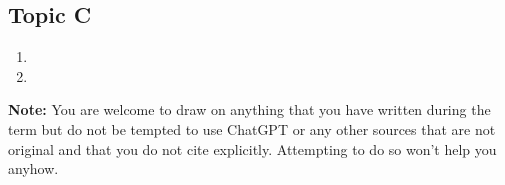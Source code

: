 \documentclass[12pt,letterpaper]{article}
\begin{document}
\subsection*{Topic C}

\begin{enumerate}
  \item 
    \answer{
    }
  \item 
    \answer{
    }
\end{enumerate}

\vspace{.2in}
\noindent
\textbf{Note:} 
  You are welcome to draw on anything that you have written during the term but do not be tempted to use ChatGPT or any other sources that are not original and that you do not cite explicitly.
  Attempting to do so won't help you anyhow.
\end{document}
